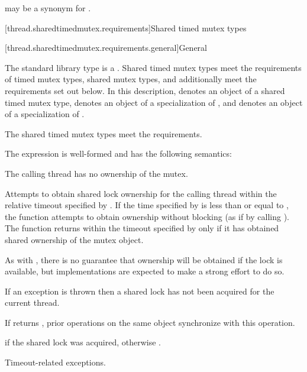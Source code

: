 \pnum
{} may be a synonym for .

[thread.sharedtimedmutex.requirements]{Shared timed mutex types}

[thread.sharedtimedmutex.requirements.general]{General}

\pnum
The standard library type  is a
. Shared timed mutex types meet the requirements of
timed mutex types,
shared mutex types, and additionally
meet the requirements set out below. In this description,
 denotes an object of a shared timed mutex type,
 denotes an object of a specialization of
, and
 denotes an object of a specialization of
.
\begin{note}
The shared timed mutex types meet the 
requirements.
\end{note}

\pnum
The expression  is well-formed and
has the following semantics:

\begin{itemdescr}
\pnum
\expects
The calling thread has no ownership of the mutex.

\pnum
\effects
Attempts to obtain
shared lock ownership for the calling thread within the relative
timeout specified by . If the time
specified by  is less than or equal to ,
the function attempts to obtain ownership without blocking (as if by calling
). The function returns within the timeout
specified by  only if it has obtained shared ownership of the
mutex object.
\begin{note}
As with , there is no guarantee that
ownership will be obtained if the lock is available, but implementations are
expected to make a strong effort to do so.
\end{note}
If an exception is thrown then a shared lock has not been acquired for
the current thread.

\pnum
\sync
If  returns , prior
 operations on the same object synchronize
with this operation.

\pnum
\result
{}

\pnum
\returns
{} if the shared lock was acquired, otherwise .

\pnum
\throws
Timeout-related exceptions.
\end{itemdescr}

